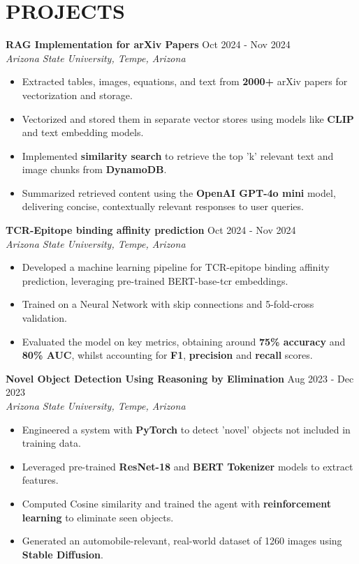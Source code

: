 \documentclass[a4paper,9pt]{extarticle}
\begin{document}
\section*{PROJECTS}

\noindent
\textbf{RAG Implementation for arXiv Papers} \hfill Oct 2024 - Nov 2024\\%
\textit{Arizona State University, Tempe, Arizona}
\begin{itemize}
    
    \item Extracted tables, images, equations, and text from \textbf{2000+} arXiv papers for vectorization and storage.
    \item Vectorized and stored them in separate vector stores using models like \textbf{CLIP} and text embedding models.
    \item Implemented \textbf{similarity search} to retrieve the top 'k' relevant text and image chunks from \textbf{DynamoDB}.
    \item Summarized retrieved content using the \textbf{OpenAI GPT-4o mini} model, delivering concise, contextually relevant responses to user queries.
\end{itemize}

\noindent
\textbf{TCR-Epitope binding affinity prediction}  \hfill Oct 2024 - Nov 2024\\ %
\textit{Arizona State University, Tempe, Arizona} %
\begin{itemize}
    \item Developed a machine learning pipeline for TCR-epitope binding affinity prediction, leveraging pre-trained BERT-base-tcr embeddings.
    \item Trained on a Neural Network with skip connections and 5-fold-cross validation.
    \item Evaluated the model on key metrics, obtaining around \textbf{75\% accuracy} and \textbf{80\% AUC}, whilst accounting for \textbf{F1}, \textbf{precision} and \textbf{recall} scores.
    
\end{itemize}

\noindent
\textbf{Novel Object Detection Using Reasoning by Elimination} \hfill Aug 2023 - Dec 2023\\%
\textit{Arizona State University, Tempe, Arizona}
\begin{itemize}
    \item Engineered a system with \textbf{PyTorch} to detect 'novel' objects not included in training data.
    \item Leveraged pre-trained \textbf{ResNet-18} and \textbf{BERT Tokenizer} models to extract features. 
    \item Computed Cosine similarity and trained the agent with \textbf{reinforcement learning} to eliminate seen objects.
    \item Generated an automobile-relevant, real-world dataset of 1260 images using \textbf{Stable Diffusion}. %
\end{itemize}

\end{document}
